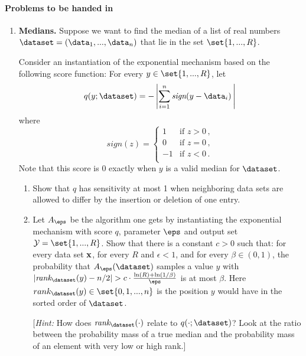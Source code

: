 \documentclass[11pt]{article}
\begin{document}
 \paragraph{Problems to be handed in}
\begin{enumerate}[leftmargin=\parindent, itemsep=3ex]

\item     {\bf Medians.}
    Suppose we want to find the median of a list of real numbers
      $\dataset = (\data_1,...,\data_n)$ that lie in the set $\set{1,...,R}$. 

      Consider an instantiation of the exponential mechanism based on the
      following score function: 
      For every $y\in \set{1,...,R}$, let
        $$q(y; \dataset) = - \left|\sum_{i=1}^n \textit{sign}(y - \data_i)\, \right|
        \,$$
        where $$\textit{sign}(z)=
        \begin{cases}
          1 & \text{if }z>0 \,,\\
          0 &          \text{if }z=0 \,,\\
          -1 & \text{if }z<0 \,.\\
        \end{cases}$$
        Note that this score is 0 exactly when $y$ is a valid median
        for $\dataset$. 

        \begin{enumerate}
        \item Show that $q$ has sensitivity at most 1 when
          neighboring data sets are allowed to differ by the insertion
          or deletion of one entry.

          \item Let $A_\eps$ be the algorithm one gets by instantiating the
            exponential mechanism with score $q$, parameter $\eps$ and
            output set $\mathcal{Y} = \set{1,...,R}$. Show that there is a constant $c>0$ such that:
            for every data set $\bf x$, for
            every $R$ and $\epsilon<1$, and for every
            $\beta\in (0,1)$, the probability that $A_\eps(\dataset)$ samples a value
            $y$ with
            $|\textit{rank}_{\dataset}(y) -  n/2 | > c\cdot \frac {\ln(R) +
              \ln(1/\beta)}{\eps}$ is at most $\beta$.
            Here $rank_{\dataset}(y) \in\set{0,1,...,n}$ is the position $y$ would have in the
            sorted order of $\dataset$.

            [\emph{Hint:} How does $\textit{rank}_{\dataset}(\cdot)$
            relate to $q(\cdot ; {\dataset})$?  Look at the ratio
            between the
            probability mass of a true median  and the probability mass of
            an element with very low or high rank.]


\end{enumerate}
\end{enumerate}
\end{document}
